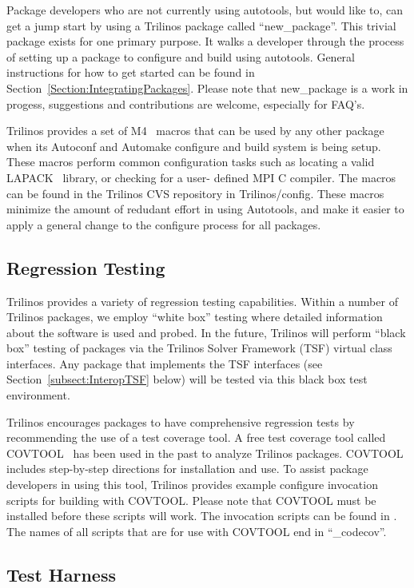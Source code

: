 \documentclass[12pt,strict]{TrilinosDevGuide}
\begin{document}
Package developers who are not currently using autotools, but would like
to, can get a jump start by using a Trilinos package called 
``new\_package''.  This trivial package exists for one primary purpose.  
It walks a developer through the process of setting up a package to 
configure and build using autotools.  General instructions for how to get 
started can be found in Section~\ref{Section:IntegratingPackages}.  Please 
note that new\_package is a work in progess, suggestions and contributions are 
welcome, especially for FAQ's.

Trilinos provides a set of M4~\cite{M4} macros that can be used by any other
package when its Autoconf and Automake configure and build system is being 
setup.  These macros perform common configuration tasks such as
locating a valid LAPACK~\cite{lapack} library, or checking for a user-
defined MPI C compiler.  The macros can be found in the Trilinos CVS 
repository in Trilinos/config.  These macros minimize the amount of redudant
 effort in using Autotools, and make it easier to apply a general change to 
the configure process for all packages.
\subsection{Regression Testing}
\label{subsect:RegressionTesting}
Trilinos provides a variety of regression
testing capabilities.  Within a number of Trilinos packages, we employ
``white box'' testing where detailed information about the software is
used and probed.  In the future, Trilinos will perform ``black box'' testing
of packages via the Trilinos Solver Framework (TSF) virtual class
interfaces.  Any package that implements the TSF interfaces (see
Section~\ref{subsect:InteropTSF} below) will be tested via this black box
test environment.

Trilinos encourages packages to have comprehensive regression tests by 
recommending the use of a test coverage tool.  A free test coverage tool 
called COVTOOL~\cite{COVTOOL} has been used in the past to analyze Trilinos 
packages.  COVTOOL includes step-by-step directions for installation and use.
To assist package developers in using this tool, Trilinos provides example 
configure invocation scripts for building with COVTOOL.  Please note that 
COVTOOL must be installed before these scripts will work.  The invocation 
scripts can be found in .  The names of all 
scripts that are for use with COVTOOL end in ``\_codecov''.

\subsection{Test Harness}
\label{subsect:TestHarness}
\end{document}
